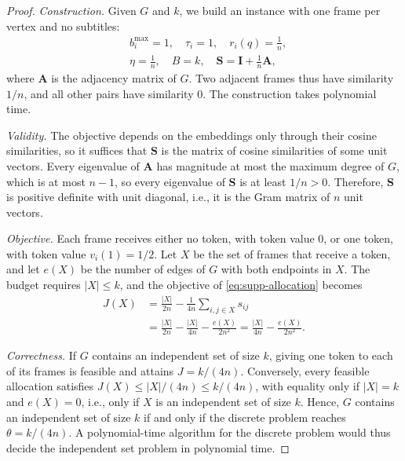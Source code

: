 \begin{proof}
\textit{Construction.} Given $G$ and $k$, we build an instance with one frame per vertex and no subtitles:
\begin{equation}
\begin{aligned}
  &b_i^{\max}=1,\quad \tau_i=1,\quad r_i(q)=\tfrac1n,\\
  &\eta=\tfrac1n,\quad B=k,\quad \mathbf S=\mathbf I+\tfrac1n\mathbf A ,
\end{aligned}
\label{eq:supp-reduction}
\end{equation}
where $\mathbf A$ is the adjacency matrix of $G$. Two adjacent frames thus have similarity $1/n$, and all other pairs have similarity $0$. The construction takes polynomial time.

\textit{Validity.} The objective depends on the embeddings only through their cosine similarities, so it suffices that $\mathbf S$ is the matrix of cosine similarities of some unit vectors. Every eigenvalue of $\mathbf A$ has magnitude at most the maximum degree of $G$, which is at most $n-1$, so every eigenvalue of $\mathbf S$ is at least $1/n>0$. Therefore, $\mathbf S$ is positive definite with unit diagonal, i.e., it is the Gram matrix of $n$ unit vectors.

\textit{Objective.} Each frame receives either no token, with token value $0$, or one token, with token value $v_i(1)=1/2$. Let $X$ be the set of frames that receive a token, and let $e(X)$ be the number of edges of $G$ with both endpoints in $X$. The budget requires $|X|\le k$, and the objective of \cref{eq:supp-allocation} becomes
\begin{equation}
\begin{aligned}
  J(X)&=\frac{|X|}{2n}-\frac{1}{4n}\sum_{i,j\in X}s_{ij}\\
      &=\frac{|X|}{2n}-\frac{|X|}{4n}-\frac{e(X)}{2n^2}
       =\frac{|X|}{4n}-\frac{e(X)}{2n^2} .
\end{aligned}
\label{eq:supp-nphard}
\end{equation}

\textit{Correctness.} If $G$ contains an independent set of size $k$, giving one token to each of its frames is feasible and attains $J=k/(4n)$. Conversely, every feasible allocation satisfies $J(X)\le|X|/(4n)\le k/(4n)$, with equality only if $|X|=k$ and $e(X)=0$, i.e., only if $X$ is an independent set of size $k$. Hence, $G$ contains an independent set of size $k$ if and only if the discrete problem reaches $\theta=k/(4n)$. A polynomial-time algorithm for the discrete problem would thus decide the independent set problem in polynomial time.
\end{proof}

